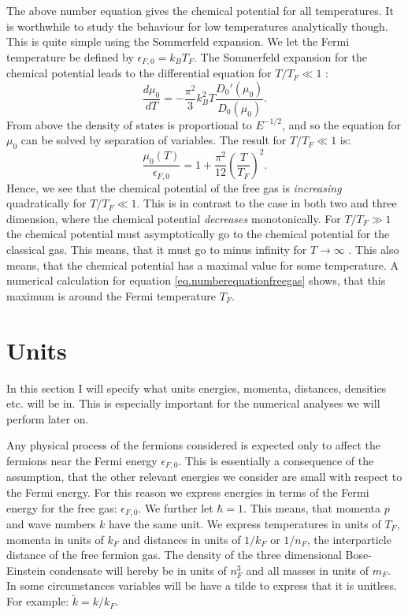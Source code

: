 The above number equation gives the chemical potential for all temperatures. It is worthwhile to study the behaviour for low temperatures analytically though. This is quite simple using the Sommerfeld expansion. We let the Fermi temperature be defined by $\epsilon_{F,0} = k_B T_F$. The Sommerfeld expansion for the chemical potential leads to the differential equation for $T/T_F \ll 1$ \cite{GiuseppeGiuseppe}:
\begin{equation}
\frac{d\mu_0}{dT} = -\frac{\pi^2}{3}k_B^2 T \frac{D_0'(\mu_0)}{D_0(\mu_0)}. \nonumber
\end{equation}
From above the density of states is proportional to $E^{-1/2}$, and so the equation for $\mu_0$ can be solved by separation of variables. The result for $T/T_F\ll 1$ is:
\begin{equation}
\frac{\mu_0(T)}{\epsilon_{F,0}} = 1 + \frac{\pi^2}{12}\left(\frac{T}{T_F}\right)^2.
\end{equation}
Hence, we see that the chemical potential of the free gas is \textit{increasing} quadratically for $T/T_F \ll 1$. This is in contrast to the case in both two and three dimension, where the chemical potential \textit{decreases} monotonically. For $T/T_F \gg 1$ the chemical potential must asymptotically go to the chemical potential for the classical gas. This means, that it must go to minus infinity for $T\to \infty$ \cite{SchroederThermal}. This also means, that the chemical potential has a maximal value for some temperature. A numerical calculation for equation \eqref{eq.numberequationfreegas} shows, that this maximum is around the Fermi temperature $T_F$. 

\section{Units}
In this section I will specify what units energies, momenta, distances, densities etc. will be in. This is especially important for the numerical analyses we will perform later on. 

Any physical process of the fermions considered is expected only to affect the fermions near the Fermi energy $\epsilon_{F,0}$. This is essentially a consequence of the assumption, that the other relevant energies we consider are small with respect to the Fermi energy. For this reason we express energies in terms of the Fermi energy for the free gas: $\epsilon_{F,0}$. We further let $\hbar = 1$. This means, that momenta $p$ and wave numbers $k$ have the same unit. We express temperatures in units of $T_F$, momenta in units of $k_F$ and distances in units of $1/k_F$ or $1/n_F$, the interparticle distance of the free fermion gas. The density of the three dimensional Bose-Einstein condensate will hereby be in units of $n_F^3$ and all masses in units of $m_F$. In some circumstances variables will be have a tilde to express that it is unitless. For example: $\tilde{k} = k/k_F$.

